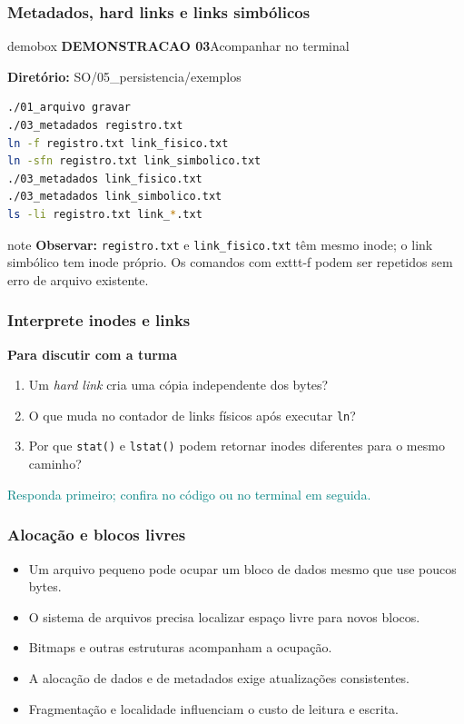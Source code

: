 \documentclass[aspectratio=169,11pt]{beamer}
\begin{document}
\begin{frame}[fragile]
\frametitle{Metadados, hard links e links simbólicos}
\begin{beamercolorbox}[wd=\textwidth,sep=3mm,rounded=true]{demobox}
{\large\bfseries DEMONSTRACAO 03}\hfill{\normalsize Acompanhar no terminal}
\end{beamercolorbox}
\vspace{2mm}
\textbf{Diretório:} {\ttfamily\small SO/05\_persistencia/exemplos}
\vspace{1mm}
\begin{lstlisting}[language=bash]
./01_arquivo gravar
./03_metadados registro.txt
ln -f registro.txt link_fisico.txt
ln -sfn registro.txt link_simbolico.txt
./03_metadados link_fisico.txt
./03_metadados link_simbolico.txt
ls -li registro.txt link_*.txt
\end{lstlisting}
\begin{beamercolorbox}[wd=\textwidth,sep=2mm,rounded=true]{note}
\small\textbf{Observar:} \texttt{registro.txt} e \texttt{link\_fisico.txt} têm mesmo inode; o link simbólico tem inode próprio. Os comandos com 	exttt{-f} podem ser repetidos sem erro de arquivo existente.
\end{beamercolorbox}
\end{frame}

\begin{frame}
\frametitle{Interprete inodes e links}
{\large\textbf{Para discutir com a turma}}\par\medskip\begin{enumerate}\item Um \textit{hard link} cria uma cópia independente dos bytes?
\item O que muda no contador de links físicos após executar \texttt{ln}?
\item Por que \texttt{stat()} e \texttt{lstat()} podem retornar inodes diferentes para o mesmo caminho?
\end{enumerate}\vfill\textcolor{teal}{\footnotesize Responda primeiro; confira no código ou no terminal em seguida.}
\end{frame}

\begin{frame}
\frametitle{Alocação e blocos livres}
\large
\begin{itemize}
\item Um arquivo pequeno pode ocupar um bloco de dados mesmo que use poucos bytes.
\item O sistema de arquivos precisa localizar espaço livre para novos blocos.
\item Bitmaps e outras estruturas acompanham a ocupação.
\item A alocação de dados e de metadados exige atualizações consistentes.
\item Fragmentação e localidade influenciam o custo de leitura e escrita.
\end{itemize}

\end{frame}
\end{document}
